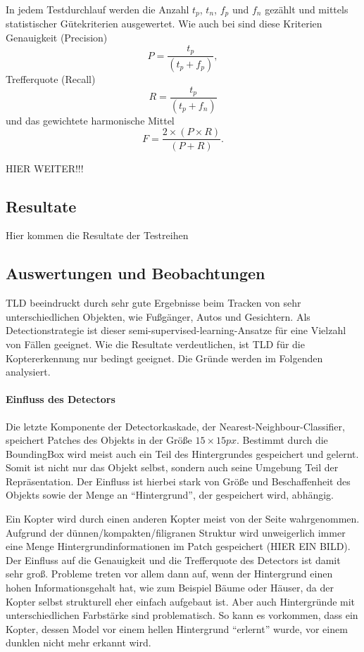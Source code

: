 	In jedem Testdurchlauf werden die Anzahl $t_p$, $t_n$, $f_p$ und $f_n$ gezählt und mittels statistischer Gütekriterien ausgewertet. 
  Wie auch bei \cite{TLD} sind diese Kriterien Genauigkeit (Precision) \begin{equation} P=\frac{t_p}{(t_p + f_p)},\end{equation}
  Trefferquote (Recall) \begin{equation} R=\frac{t_p}{(t_p + f_n)} \end{equation}
  und das gewichtete harmonische Mittel \begin{equation} F=\frac{2 \times (P \times R)}{(P + R)}.\end{equation}

  HIER WEITER!!!

\subsection{Resultate}
	Hier kommen die Resultate der Testreihen 

\subsection{Auswertungen und Beobachtungen}
TLD beeindruckt durch sehr gute Ergebnisse beim Tracken von sehr unterschiedlichen Objekten, wie Fußgänger, Autos und Gesichtern. Als Detectionstrategie ist dieser semi-supervised-learning-Ansatze für eine Vielzahl von Fällen geeignet. Wie die Resultate verdeutlichen, ist TLD für die Koptererkennung nur bedingt geeignet. Die Gründe werden im Folgenden analysiert.

\paragraph{Einfluss des Detectors}
Die letzte Komponente der Detectorkaskade, der Nearest-Neighbour-Classifier, speichert Patches des Objekts in der Größe $15\times15 px$. Bestimmt durch die BoundingBox wird meist auch ein Teil des Hintergrundes gespeichert und gelernt. Somit ist nicht nur das Objekt selbst, sondern auch seine Umgebung Teil der Repräsentation. Der Einfluss ist hierbei stark von Größe und Beschaffenheit des Objekts sowie der Menge an ``Hintergrund'', der gespeichert wird, abhängig.

Ein Kopter wird durch einen anderen Kopter meist von der Seite wahrgenommen. Aufgrund der dünnen/kompakten/filigranen Struktur wird unweigerlich immer eine Menge Hintergrundinformationen im Patch gespeichert (HIER EIN BILD). Der Einfluss auf die Genauigkeit und die Trefferquote des Detectors ist damit sehr groß. Probleme treten vor allem dann auf, wenn der Hintergrund einen hohen Informationsgehalt hat, wie zum Beispiel Bäume oder Häuser, da der Kopter selbst strukturell eher einfach aufgebaut ist. Aber auch Hintergründe mit unterschiedlichen Farbstärke sind problematisch. So kann es vorkommen, dass ein Kopter, dessen Model vor einem hellen Hintergrund ``erlernt'' wurde, vor einem dunklen nicht mehr erkannt wird. 

